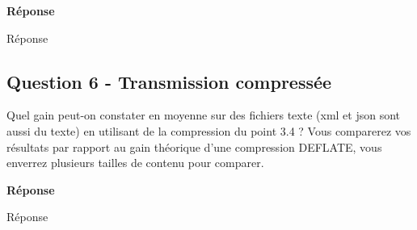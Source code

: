 \documentclass[francais,12pt]{article}
\begin{document}
	{\color[rgb]{0,0.5,0.23}\textbf{Réponse}}
	
	Réponse
	
	\subsection*{Question 6 - Transmission compressée}
	Quel gain peut-on constater en moyenne sur des fichiers texte (xml et json sont aussi du texte) en utilisant de la compression du point 3.4 ? Vous comparerez vos résultats par rapport au gain théorique d'une compression DEFLATE, vous enverrez plusieurs tailles de contenu pour comparer.
	
	{\color[rgb]{0,0.5,0.23}\textbf{Réponse}}
	
	Réponse
	
	
\end{document}
